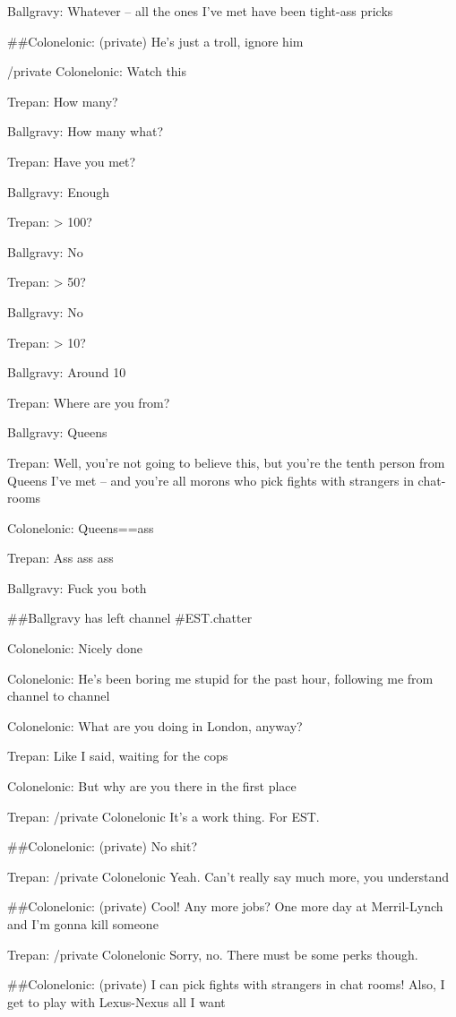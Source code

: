 Ballgravy: Whatever -- all the ones I've met have been tight-ass
pricks

\#\#Colonelonic: (private) He's just a troll, ignore him

/private Colonelonic: Watch this

Trepan: How many?

Ballgravy: How many what?

Trepan: Have you met?

Ballgravy: Enough

Trepan: \textgreater{} 100?

Ballgravy: No

Trepan: \textgreater{} 50?

Ballgravy: No

Trepan: \textgreater{} 10?

Ballgravy: Around 10

Trepan: Where are you from?

Ballgravy: Queens

Trepan: Well, you're not going to believe this, but you're the
tenth person from Queens I've met -- and you're all morons who pick
fights with strangers in chat-rooms

Colonelonic: Queens==ass

Trepan: Ass ass ass

Ballgravy: Fuck you both

\#\#Ballgravy has left channel \#EST.chatter

Colonelonic: Nicely done

Colonelonic: He's been boring me stupid for the past hour,
following me from channel to channel

Colonelonic: What are you doing in London, anyway?

Trepan: Like I said, waiting for the cops

Colonelonic: But why are you there in the first place

Trepan: /private Colonelonic It's a work thing. For EST.

\#\#Colonelonic: (private) No shit?

Trepan: /private Colonelonic Yeah. Can't really say much more, you
understand

\#\#Colonelonic: (private) Cool! Any more jobs? One more day at
Merril-Lynch and I'm gonna kill someone

Trepan: /private Colonelonic Sorry, no. There must be some perks
though.

\#\#Colonelonic: (private) I can pick fights with strangers in chat
rooms! Also, I get to play with Lexus-Nexus all I want

